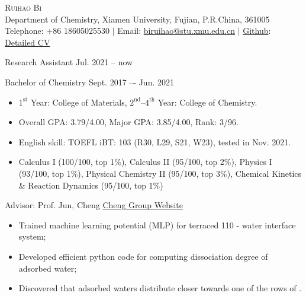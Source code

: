 \pagestyle{plain}
\thispagestyle{empty} %
\begin{center}
    \Large{\textsc{Ruihao Bi}} \\ 
    \normalsize {Department of Chemistry, Xiamen University, Fujian, P.R.China, 361005} \\ 
    Telephone: {+86 18605025530} $|$ 
    Email: {\href{mailto:biruihao@stu.xmu.edu.cn}{biruihao@stu.xmu.edu.cn}} $|$ 
    \href{placeholder}{Github}: \href{placeholder}{Detailed CV}  \\
\end{center}

\sectionrule
{}

\noindent Research Assistant \hfill {Jul. 2021 -- now}

\noindent Bachelor of Chemistry \hfill {Sept. 2017 –- Jun. 2021}

\begin{itemize}
    \item $\mathrm{1^{st}}$ Year: College of Materials, $\mathrm{2^{nd}}$--$\mathrm{4^{th}}$ Year: College of Chemistry.
    \item Overall GPA: 3.79/4.00, Major GPA: 3.85/4.00, Rank: 3/96.
    \item English skill: TOEFL iBT: 103 (R30, L29, S21, W23), tested in Nov. 2021.
\end{itemize}



\noindent{}
\begin{itemize}
    \item Calculus I (100/100, top 1\%), Calculus II (95/100, top 2\%), Physics I (93/100, top 1\%), Physical Chemistry II (95/100, top 3\%), Chemical Kinetics \& Reaction Dynamics (95/100, top 1\%)
\end{itemize}

\vspace{5mm}
\sectionrule



{\noindent Advisor: Prof. Jun, Cheng  \hfill \href{https://chengjun.xmu.edu.cn/}{Cheng Group Website}}


\begin{itemize}
    \item Trained machine learning potential (MLP) for terraced  110 - water interface system;
    \item Developed efficient python code for computing dissociation degree of adsorbed water;
    \item Discovered that  adsorbed waters distribute closer towards one of the rows of .
\end{itemize}

